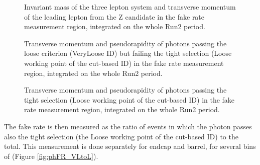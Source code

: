 \begin{figure}
  \centering
  \quad
  \caption{Invariant mass of the three lepton system and transverse momentum of the leading lepton from the Z candidate
  in the fake rate measurement region, integrated on the whole Run2 period.}
  \label{fig:CRLFR_inclusive}
\end{figure}

\begin{figure}
  \centering
  \quad
  \caption{Transverse momentum and pseudorapidity of photons passing the loose criterion (VeryLoose ID) but failing the tight selection (Loose working point of the cut-based ID)
    in the fake rate measurement region, integrated on the whole Run2 period.}
  \label{fig:CRLFR_lead_fail}
\end{figure}

\begin{figure}
  \centering
  \quad
  \caption{Transverse momentum and pseudorapidity of photons passing the tight selection (Loose working point of the cut-based ID)
    in the fake rate measurement region, integrated on the whole Run2 period.}
  \label{fig:CRLFR_lead_pass}
\end{figure}

The fake rate is then measured as the ratio of events in which the photon passes also the tight selection (the Loose working point of the cut-based ID)
to the total.
This measurement is done separately for endcap and barrel, for several bins of \pt (Figure \ref{fig:phFR_VLtoL}).

